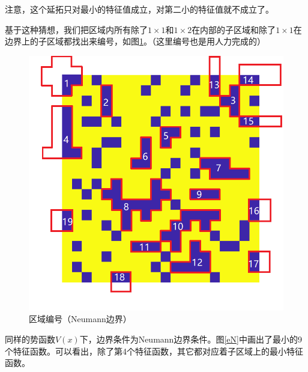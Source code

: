 \documentclass[12pt,a4paper]{article}
\begin{document}
注意，这个延拓只对最小的特征值成立，对第二小的特征值就不成立了。

基于这种猜想，我们把区域内所有除了$1\times1$和$1\times2$在内部的子区域和除了$1\times1$在边界上的子区域都找出来编号，如图\ref{rN}。（这里编号也是用人力完成的）

\begin{figure}[htbp]
\centering
\includegraphics[width=0.4\linewidth]{pics/edVN}
\caption{区域编号（Neumann边界）}
\label{rN}
\end{figure}

同样的势函数$V(x)$下，边界条件为Neumann边界条件。图\ref{eN}中画出了最小的9个特征函数。可以看出，除了第4个特征函数，其它都对应着子区域上的最小特征函数。
\end{document}
